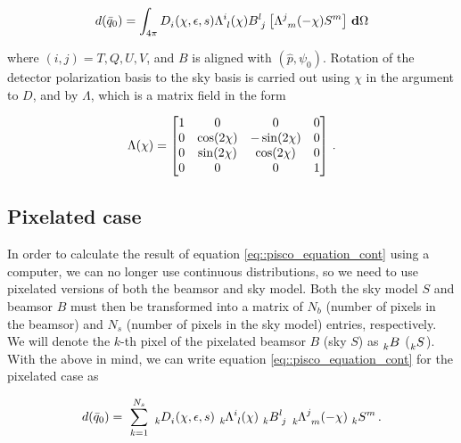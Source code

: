 \documentclass[a4paper,11pt]{article}
\begin{document}
\begin{equation}
\begin{aligned}
d(\bar{q}_0) =  \int_{4\pi} \tensor{D}{_{i}}(\chi,\epsilon,s) \tensor{\Lambda}{^{i}_{l}}(\chi)  \tensor{B}{^{l}_{j} } \left[ \tensor{\Lambda}{^{j}_{m}}(-\chi) \tensor{S}{^{m}} \right ] \, \mathbf{d} \Omega 
\end{aligned}
\label{eq::pisco_equation_cont}
\end{equation}

\noindent
where $(i,j) = T,Q,U,V$, and $B$ is aligned with $(\hat{p},\psi_0)$. Rotation of the detector polarization basis to the sky basis is carried out using $\chi$ in the argument to $D$, and by $\Lambda$, which is a matrix field in the form

\begin{equation}
\begin{aligned}
\Lambda(\chi) =
\begin{bmatrix}
1  & 0 & 0 & 0\\
0  & \cos(2\chi) & -\sin(2\chi) & 0\\
0  &\sin(2\chi) & \cos(2\chi) & 0\\
0  & 0 & 0 & 1
\end{bmatrix}  \, \rm{.}
\end{aligned}
\label{eq::lambda_operator}
\end{equation}

\subsection{Pixelated case}
\label{sec::pixel_conv}

In order to calculate the result of equation \ref{eq::pisco_equation_cont} using a computer, we can no longer use continuous distributions, so we need to use pixelated versions of both the beamsor and sky model. Both the sky model $S$ and beamsor $B$ must then be transformed into a matrix of $N_b$ (number of pixels in the beamsor) and $N_s$ (number of pixels in the sky model) entries, respectively. We will denote the $k$-th pixel of the pixelated beamsor $B$ (sky $S$) as $\tensor[_k]{B}{}$ ($\tensor[_k]{S}{}$). With the above in mind, we can write equation \ref{eq::pisco_equation_cont} for the pixelated case as

\begin{equation}
\begin{aligned}
d(\bar{q}_0) = \
\sum_{k=1}^{N_s} \
\tensor[_k]{D}{_{i}}(\chi,\epsilon,s) \
\tensor[_k]{\Lambda}{^{i}_{l}}(\chi) \
\tensor[_k]{B}{^l_j} \
\tensor[_k]{\Lambda}{^{j}_{m}}(-\chi) \
\tensor[_k]{S}{^m}  \, \rm{.}
\end{aligned}
\label{eq::discrete_beam_conv_tensor}
\end{equation}
\end{document}

